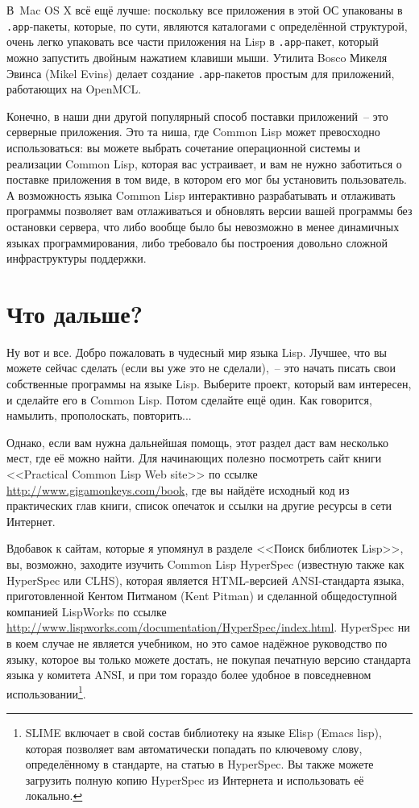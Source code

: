 В~Mac OS X всё ещё лучше: поскольку все приложения в этой ОС упакованы в \texttt{.app}-пакеты,
которые, по сути, являются каталогами с определённой структурой, очень легко упаковать все
части приложения на Lisp в \texttt{.app}-пакет, который можно запустить двойным нажатием клавиши
мыши. Утилита Bosco Микеля Эвинса (Mikel Evins) делает создание \texttt{.app}-пакетов простым для
приложений, работающих на OpenMCL.

Конечно, в наши дни другой популярный способ поставки приложений~-- это серверные
приложения. Это та ниша, где Common Lisp может превосходно использоваться: вы можете
выбрать сочетание операционной системы и реализации Common Lisp, которая вас устраивает, и
вам не нужно заботиться о поставке приложения в том виде, в котором его мог бы установить
пользователь. А возможность языка Common Lisp интерактивно разрабатывать и отлаживать
программы позволяет вам отлаживаться и обновлять версии вашей программы без остановки
сервера, что либо вообще было бы невозможно в менее динамичных языках программирования,
либо требовало бы построения довольно сложной инфраструктуры поддержки.

\section{Что дальше?}

Ну вот и все. Добро пожаловать в чудесный мир языка Lisp. Лучшее, что вы можете сейчас
сделать (если вы уже это не сделали),~-- это начать писать свои собственные программы на
языке Lisp. Выберите проект, который вам интересен, и сделайте его в Common Lisp. Потом
сделайте ещё один. Как говорится, намылить, прополоскать, повторить...

Однако, если вам нужна дальнейшая помощь, этот раздел даст вам несколько мест, где её
можно найти. Для начинающих полезно посмотреть сайт книги <<Practical Common Lisp Web
site>> по ссылке \url{http://www.gigamonkeys.com/book}, где вы найдёте исходный код из
практических глав книги, список опечаток и ссылки на другие ресурсы в сети Интернет.

Вдобавок к сайтам, которые я упомянул в разделе <<Поиск библиотек Lisp>>, вы, возможно,
заходите изучить Common Lisp HyperSpec (известную также как HyperSpec или CLHS), которая
является HTML-версией ANSI-стандарта языка, приготовленной Кентом Питманом (Kent Pitman) и
сделанной общедоступной компанией LispWorks по ссылке
\url{http://www.lispworks.com/documentation/HyperSpec/index.html}. HyperSpec ни в коем
случае не является учебником, но это самое надёжное руководство по языку, которое вы
только можете достать, не покупая печатную версию стандарта языка у комитета ANSI, и при
том гораздо более удобное в повседневном использовании\footnote{SLIME включает в свой
  состав библиотеку на языке Elisp (Emacs lisp), которая позволяет вам автоматически
  попадать по ключевому слову, определённому в стандарте, на статью в HyperSpec. Вы также
  можете загрузить полную копию HyperSpec из Интернета и использовать её локально.}.

